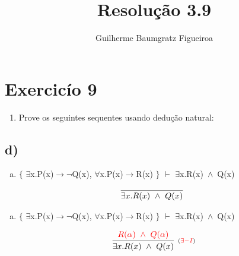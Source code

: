 \documentclass[aspectratio=43]{beamer}
\title[\sc{Resolu\c c\~ao}]{Resolu\c c\~ao 3.9}
\author[Guilherme Baumgratz Figueiroa]{Guilherme Baumgratz Figueiroa}
\institute[UFOP]{Universidade Federal de Ouro Preto} %
\date{}
\newcommand{\ria}{$\rightarrow$}
\newcommand{\fall}{$\forall$}
\newcommand{\ex}{$\exists$}
\newcommand{\nao}{$\neg$}
\newcommand{\andd}{$\wedge$}
\begin{document}
	
	\begin{frame}
		\titlepage
	\end{frame}
	
	\section{Exercic\'io 9}
	
	\begin{frame}%
    
    	\begin{enumerate}[1.]
			\item Prove os seguintes sequentes usando dedu\c c\~ao natural: \\
		\end{enumerate}
				
	\end{frame}
    \subsection{d)}
    
    \begin{frame}[fragile]
    
    	\begin{enumerate}[d)]
			\item $\{$ \ex x.P(x)\ria \nao Q(x), \fall x.P(x)\ria R(x) $\}$ $\vdash$ \ex x.R(x)\ \andd\ Q(x) \\
		\end{enumerate}
        
        \vspace{80pt}
        
        \[
        \begin{array}{c}
		
        	\infer[_{}]
            	{\exists  x. R(x)\ \land\ Q(x)}
            	{}
        
		\end{array}
        \]
        
	\end{frame}
    
    \begin{frame}[fragile]
    
    	\begin{enumerate}[d)]
			\item $\{$ \ex x.P(x)\ria \nao Q(x), \fall x.P(x)\ria R(x) $\}$ $\vdash$ \ex x.R(x)\ \andd\ Q(x) \\
		\end{enumerate}
        
        \vspace{80pt}
        
        \[
        \begin{array}{c}
		
        	\infer[_{(\textcolor{red}{\exists -I})}]
            	{\exists  x. R(x)\ \land\ Q(x)}
            	{\textcolor{red}{R(\alpha)\ \land\ Q(\alpha)}}
        
		\end{array}
        \]
        
	\end{frame}
    
\end{document}
